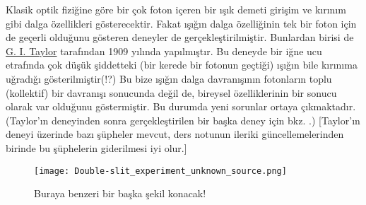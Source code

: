 \documentclass[a4paper,12pt, twoside]{article}
\begin{document}
Klasik optik fiziğine göre  bir çok foton içeren bir ışık demeti girişim ve kırınım gibi dalga özellikleri gösterecektir. Fakat ışığın dalga özelliğinin tek bir foton için de geçerli olduğunu gösteren deneyler de gerçekleştirilmiştir. Bunlardan birisi de \href{https://en.wikipedia.org/wiki/G._I._Taylor#Career_and_research}{G. I. Taylor} tarafından 1909 yılında yapılmıştır. Bu deneyde bir iğne ucu etrafında çok düşük şiddetteki (bir kerede bir fotonun geçtiği) ışığın bile kırınıma uğradığı gösterilmiştir(!?) Bu bize ışığın dalga davranışının fotonların toplu (kollektif) bir davranışı sonucunda değil de, bireysel özelliklerinin bir sonucu olarak var olduğunu göstermiştir. Bu durumda yeni sorunlar ortaya çıkmaktadır. {\color{red} (Taylor'ın deneyinden sonra gerçekleştirilen bir başka deney için bkz. \cite{Grangier_1986}.)} {\color{gray} [Taylor'ın deneyi üzerinde bazı şüpheler mevcut, ders notunun ileriki güncellemelerinden birinde bu şüphelerin giderilmesi iyi olur.]}





%


\begin{figure}[hbtp]
\center
\texttt{[image: Double-slit\_experiment\_unknown\_source.png]}
\caption{Buraya benzeri bir başka şekil konacak!}
\label{fig:dobule_slit_experiment}
\end{figure}
\end{document}
